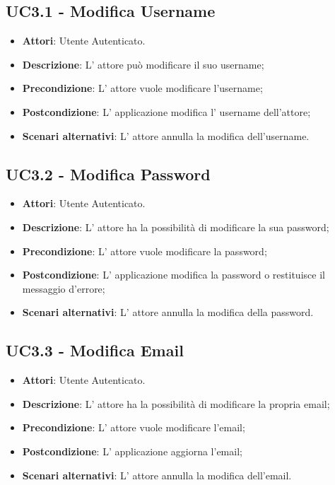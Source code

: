 \subsection{UC3.1 - Modifica Username} 
\label{ssec:UC3.1} 
\begin{itemize} 
\item \textbf{Attori}: Utente Autenticato.
\item \textbf{Descrizione}: L' attore può modificare il suo username;
\item \textbf{Precondizione}: L'  attore vuole modificare l'username;
\item \textbf{Postcondizione}: L' applicazione modifica l' username dell'attore;
\item \textbf{Scenari alternativi}: L' attore annulla la modifica dell'username.
\end{itemize} 
\subsection{UC3.2 - Modifica Password} 
\label{ssec:UC3.2} 
\begin{itemize} 
\item \textbf{Attori}: Utente Autenticato.
\item \textbf{Descrizione}: L' attore ha la possibilità di modificare la sua password;
\item \textbf{Precondizione}: L'  attore vuole modificare la password;
\item \textbf{Postcondizione}: L' applicazione modifica la password o restituisce il messaggio d'errore;
\item \textbf{Scenari alternativi}: L' attore annulla la modifica della password.
\end{itemize} 
\subsection{UC3.3 - Modifica Email} 
\label{ssec:UC3.3} 
\begin{itemize} 
\item \textbf{Attori}: Utente Autenticato.
\item \textbf{Descrizione}: L' attore ha la possibilità di modificare la propria email;
\item \textbf{Precondizione}: L' attore vuole modificare l'email;
\item \textbf{Postcondizione}: L' applicazione aggiorna l'email;
\item \textbf{Scenari alternativi}: L' attore annulla la modifica dell'email.
\end{itemize} 
